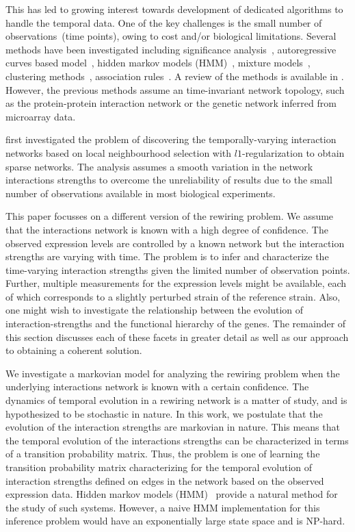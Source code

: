 \documentclass{bioinfo}
\begin{document}
This has led to growing interest towards development of dedicated
algorithms to handle the temporal data. One of the key challenges
is the small number of observations~(time points), owing to cost
and/or biological limitations.  Several methods have been
investigated including significance
analysis~\citep{Tusher01sam,Leek06EDGE}, autoregressive curves based
model~\citep{Ramoni02cluster}, 
hidden markov models (HMM)~\citep{DBLP:conf/ismb/SchliepSS03,citeulike:1069055}, mixture 
models~\citep{DBLP:conf/ismb/SchliepSS04,DBLP:journals/bioinformatics/CostaSS05},
clustering methods~\citep{Ernst06STEM}, association
rules~\citep{Nam2009}. A review of the methods is available in
\cite{Androulakis2007}. However, the previous methods 
assume an time-invariant network topology, such as the protein-protein
interaction network or the genetic network inferred from microarray
data. 

\cite{Song09KELLER} first investigated the problem of discovering the
temporally-varying interaction networks based on local neighbourhood selection
with $l1$-regularization to obtain sparse networks. The analysis assumes a
smooth variation in the network interactions strengths to overcome the
unreliability of results due to the small number of observations
available in most biological experiments. 

This paper focusses on a different version of the rewiring problem. We
assume that the interactions network is known with a high degree of
confidence.  The observed expression levels are
controlled by a known network but  the interaction strengths are
varying with time. The problem is to infer and characterize the
time-varying interaction strengths given the limited number of
observation points. Further, multiple measurements for the expression
levels might be available, each of which corresponds to a slightly
perturbed strain of the reference strain. Also, one might wish to
investigate the relationship between the evolution of
interaction-strengths and the functional hierarchy of the genes. The
remainder of this section discusses each of these facets
in greater detail as well as our approach to obtaining a coherent
solution. 

We investigate a markovian model for analyzing the rewiring
problem when the underlying interactions network is known with a
certain confidence. The dynamics of temporal evolution in a rewiring
network is a matter of study, and is hypothesized to be stochastic in
nature. In this work, we postulate that the evolution of the
interaction strengths are markovian in nature. This means that the temporal evolution of
the interactions strengths can be characterized in terms of a
transition probability matrix.  Thus, the problem is one of learning
the transition probability matrix characterizing for the temporal
evolution of interaction strengths defined on edges in the network based on the observed
expression data. Hidden markov models (HMM)~\citep{Rabiner89hmm,Cappe07hmm}
provide a natural method for the study of such systems. However, a
naive HMM implementation for this inference problem would have an
exponentially large state space and is NP-hard. 
\end{document}
